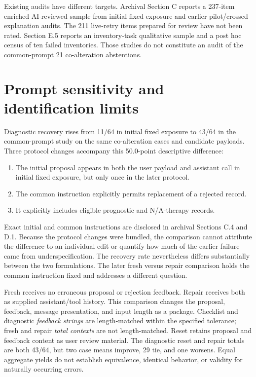 \documentclass[11pt]{article}
\begin{document}
Existing audits have different targets. Archival Section C reports a 237-item
enriched AI-reviewed sample from initial fixed exposure and earlier
pilot/crossed explanation audits. The 211 live-retry items prepared for review have not been rated.
Section E.5 reports an inventory-task qualitative sample and a post hoc census
of ten failed inventories. Those studies do not constitute an audit of the
common-prompt 21 co-alteration abstentions.

\section{Prompt sensitivity and identification limits}

Diagnostic recovery rises from 11/64 in initial fixed exposure to 43/64 in the
common-prompt study on the same co-alteration cases and candidate payloads.
Three protocol changes accompany this 50.0-point descriptive difference:

\begin{enumerate}
\item The initial proposal appears in both the user payload and assistant call
in initial fixed exposure, but only once in the later protocol.
\item The common instruction explicitly permits replacement of a rejected record.
\item It explicitly includes eligible prognostic and N/A-therapy records.
\end{enumerate}

Exact initial and common instructions are disclosed in archival Sections C.4 and
D.1. Because the protocol changes were bundled, the comparison cannot attribute
the difference to an individual edit or quantify how much of the earlier failure
came from underspecification. The recovery rate nevertheless differs
substantially between the two formulations. The later fresh versus repair
comparison holds the common instruction fixed and addresses a different
question.

Fresh receives no erroneous proposal or rejection feedback. Repair receives both
as supplied assistant/tool history. This comparison changes the proposal,
feedback, message presentation, and input length as a package. Checklist and
diagnostic \emph{feedback strings} are length-matched within the specified
tolerance; fresh and repair \emph{total contexts} are not length-matched. Reset
retains proposal and feedback content as user review material. The diagnostic
reset and repair totals are both 43/64, but two case means improve, 29 tie, and
one worsens. Equal aggregate yields do not establish equivalence, identical
behavior, or validity for naturally occurring errors.
\end{document}

